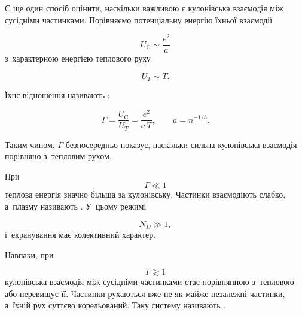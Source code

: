 Є ще один спосіб оцінити, наскільки важливою є кулонівська взаємодія між сусідніми
частинками. Порівняємо потенціальну енергію їхньої взаємодії

\begin{equation*}
    U_{\mathrm C}\sim\frac{e^2}{a}
\end{equation*}
%
з~характерною енергією теплового руху

\begin{equation*}
    U_T\sim T.
\end{equation*}

Їхнє відношення називають :

\begin{equation}\label{eq:Gamma}
    \Gamma=
    \frac{U_{\mathrm C}}{U_T}
    =
    \frac{e^2}{a\,T},
    \qquad
    a=n^{-1/3}.
\end{equation}

Таким чином, $\Gamma$ безпосередньо показує, наскільки сильна кулонівська взаємодія
порівняно з~тепловим рухом.

При
\begin{equation*}
    \Gamma\ll1
\end{equation*}
теплова енергія значно більша за кулонівську. Частинки взаємодіють слабко, а~плазму
називають . У~цьому режимі

\begin{equation*}
    N_D\gg1,
\end{equation*}
і~екранування має колективний характер.

Навпаки, при

\begin{equation*}
    \Gamma\gtrsim1
\end{equation*}
кулонівська взаємодія між сусідніми частинками стає порівнянною з~тепловою або перевищує
її. Частинки рухаються вже не як майже незалежні частинки, а~їхній рух суттєво
корельований. Таку систему називають .

